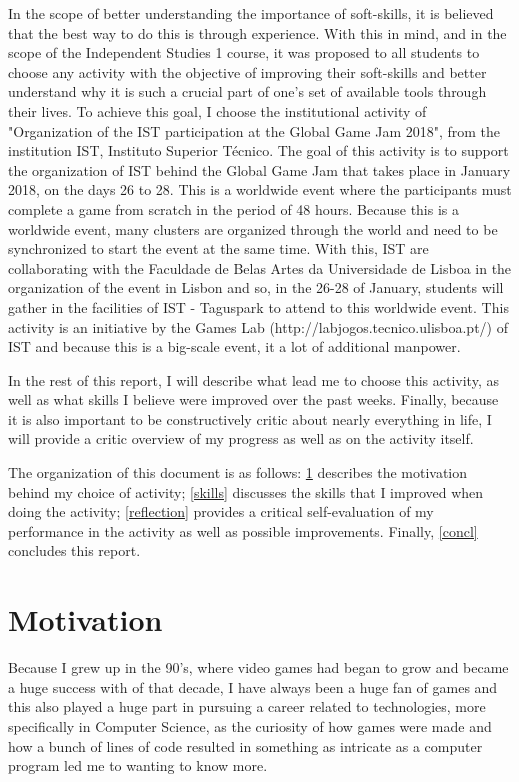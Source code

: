 \documentclass[a4paper,12pt,journal,twoside,compsoc]{PPIEEEtran}
\begin{document}
In the scope of better understanding the importance of soft-skills, it is believed that the best way to do this is through experience. With this in mind, and in the scope of the Independent Studies 1 course, it was proposed to all students to choose any activity with the objective of improving their soft-skills and better understand why it is such a crucial part of one's set of available tools through their lives. To achieve this goal, I choose the institutional activity of "Organization of the IST participation at the Global Game Jam 2018", from the institution IST, Instituto Superior Técnico. The goal of this activity is to support the organization of IST behind the Global Game Jam that takes place in January 2018, on the days 26 to 28. This is a worldwide event where the participants must complete a game from scratch in the period of 48 hours. Because this is a worldwide event, many clusters are organized through the world and need to be synchronized to start the event at the same time. With this, IST are collaborating with the Faculdade de Belas Artes da Universidade de Lisboa in the organization of the event in Lisbon and so, in the 26-28 of January, students will gather in the facilities of IST - Taguspark to attend to this worldwide event. This activity is an initiative by the Games Lab (http://labjogos.tecnico.ulisboa.pt/) of IST and because this is a big-scale event, it a lot of additional manpower. 

In the rest of this report, I will describe what lead me to choose this activity, as well as what skills I believe were improved over the past weeks. Finally, because it is also important to be constructively critic about nearly everything in life, I will provide a critic overview of my progress as well as on the activity itself.

The organization of this document is as follows: \cref{motivation} describes the motivation behind my choice of activity; \cref{skills} discusses the skills that I improved when doing the activity; \cref{reflection} provides a critical self-evaluation of my performance in the activity as well as possible improvements. Finally, \cref{concl} concludes this report.

\section{Motivation}
\label{motivation}

Because I grew up in the 90's, where video games had began to grow and became a huge success with of that decade, I have always been a huge fan of games and this also played a huge part in pursuing a career related to technologies, more specifically in Computer Science, as the curiosity of how games were made and how a bunch of lines of code resulted in something as intricate as a computer program led me to wanting to know more. 
\end{document}

